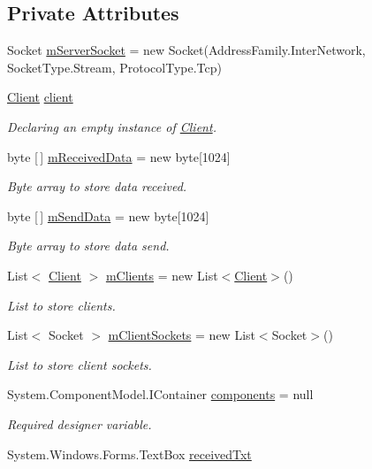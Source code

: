 \subsection*{Private Attributes}
\begin{DoxyCompactItemize}
\item 
Socket \hyperlink{class_socket_server_1_1_socket_server_a3f7c25cca8eb9e7e98dc5172368e8f62}{m\+Server\+Socket} = new Socket(Address\+Family.\+Inter\+Network, Socket\+Type.\+Stream, Protocol\+Type.\+Tcp)
\item 
\hyperlink{class_socket_server_1_1_client}{Client} \hyperlink{class_socket_server_1_1_socket_server_a2c56e560fbab349d4ed56524f1f52f9c}{client}
\begin{DoxyCompactList}\small\item\em Declaring an empty instance of \hyperlink{class_socket_server_1_1_client}{Client}. \end{DoxyCompactList}\item 
byte \mbox{[}$\,$\mbox{]} \hyperlink{class_socket_server_1_1_socket_server_a989b1e8fe5855a949087d7406db74988}{m\+Received\+Data} = new byte\mbox{[}1024\mbox{]}
\begin{DoxyCompactList}\small\item\em Byte array to store data received. \end{DoxyCompactList}\item 
byte \mbox{[}$\,$\mbox{]} \hyperlink{class_socket_server_1_1_socket_server_abd27451304549844ef2d93051764fc1a}{m\+Send\+Data} = new byte\mbox{[}1024\mbox{]}
\begin{DoxyCompactList}\small\item\em Byte array to store data send. \end{DoxyCompactList}\item 
List$<$ \hyperlink{class_socket_server_1_1_client}{Client} $>$ \hyperlink{class_socket_server_1_1_socket_server_ac9461bfbf488d01d0563f1ceb538f4c7}{m\+Clients} = new List$<$\hyperlink{class_socket_server_1_1_client}{Client}$>$()
\begin{DoxyCompactList}\small\item\em List to store clients. \end{DoxyCompactList}\item 
List$<$ Socket $>$ \hyperlink{class_socket_server_1_1_socket_server_a7333cc07bf0a885bb0f62f7ecc665742}{m\+Client\+Sockets} = new List$<$Socket$>$()
\begin{DoxyCompactList}\small\item\em List to store client sockets. \end{DoxyCompactList}\item 
System.\+Component\+Model.\+I\+Container \hyperlink{class_socket_server_1_1_socket_server_a323fc298b887e4f0f1d764662203703b}{components} = null
\begin{DoxyCompactList}\small\item\em Required designer variable. \end{DoxyCompactList}\item 
System.\+Windows.\+Forms.\+Text\+Box \hyperlink{class_socket_server_1_1_socket_server_aea45323bf62d2f24f8992a0380fd1044}{received\+Txt}
\end{DoxyCompactItemize}



